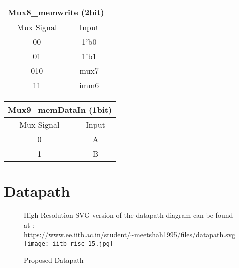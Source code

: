 \documentclass[11pt,fleqn,oneside]{book} %
\begin{document}
\begin{multicols}{3}

\begin{center}
 \begin{tabular}{||c|c||} 
 \hline
 \multicolumn{2}{|c|}{Mux8\_memwrite (2bit)} \\
 \hline
 Mux Signal & Input \\ [0.5ex] 
 \hline\hline
 00 & 1'b0  \\ 
 \hline
 01 & 1'b1  \\
 \hline
 010 & mux7  \\
 \hline
 11 & imm6  \\ [1ex] 
 \hline
\end{tabular}
\end{center}

\begin{center}
 \begin{tabular}{||c|c||} 
 \hline
 \multicolumn{2}{|c|}{Mux9\_memDataIn (1bit)} \\
 \hline
 Mux Signal & Input \\ [0.5ex] 
 \hline\hline
 0 & A  \\ 
 \hline
 1 & B  \\ [1ex] 
 \hline
\end{tabular}
\end{center}
\end{multicols}
\vspace{2cm}
\section{Datapath}
\vspace*{-1cm}
\begin{figure}[h]
    \centering
    High Resolution SVG version of the datapath diagram can be found at : \\ \url{https://www.ee.iitb.ac.in/student/\~meetshah1995/files/datapath.svg}
    \texttt{[image: iitb\_risc\_15.jpg]}
    \caption{Proposed Datapath }
    \label{fig:awesome_image}
\end{figure}
\newpage
\end{document}
